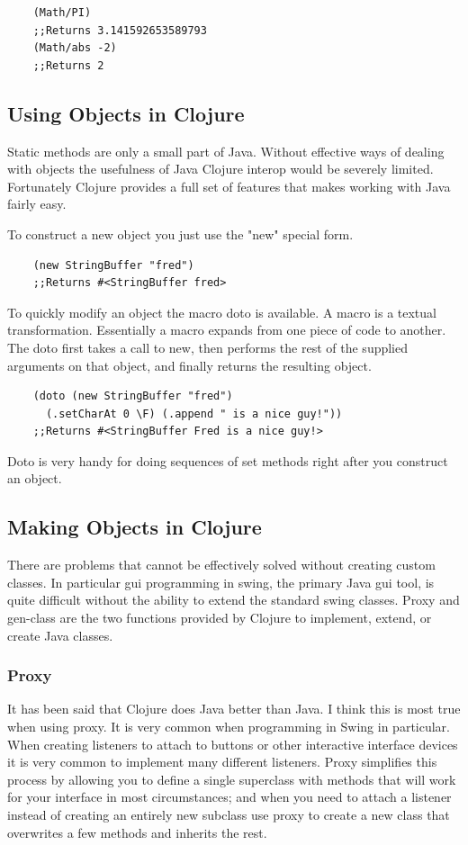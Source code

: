 \documentclass[12pt]{article}
\begin{document}
	\begin{verbatim}
	(Math/PI)
	;;Returns 3.141592653589793
	(Math/abs -2)
	;;Returns 2
	\end{verbatim}
	
	\subsection{Using Objects in Clojure}
	Static methods are only a small part of Java. Without effective ways of dealing with objects the usefulness of Java Clojure interop would be severely limited. Fortunately Clojure provides a full set of features that makes working with Java fairly easy.
	
	To construct a new object you just use the "new" special form.
	\begin{verbatim}
	(new StringBuffer "fred")
	;;Returns #<StringBuffer fred>
	\end{verbatim} 
	
	To quickly modify an object the macro doto is available. A macro is a textual transformation. Essentially a macro expands from one piece of code to another. The doto first takes a call to new, then performs the rest of the supplied arguments on that object, and finally returns the resulting object.
	\begin{verbatim}
	(doto (new StringBuffer "fred") 
	  (.setCharAt 0 \F) (.append " is a nice guy!"))
	;;Returns #<StringBuffer Fred is a nice guy!>
	\end{verbatim}
	Doto is very handy for doing sequences of set methods right after you construct an object.
	
	\subsection{Making Objects in Clojure}
	There are problems that cannot be effectively solved without creating custom classes. In particular gui programming in swing, the primary Java gui tool, is quite difficult without the ability to extend the standard swing classes. Proxy and gen-class are the two functions provided by Clojure to implement, extend, or create Java classes. 
	\subsubsection{Proxy}
	It has been said that Clojure does Java better than Java\cite{halloway:better}. I think this is most true when using proxy. It is very common when programming in Swing in particular. When creating listeners to attach to buttons or other interactive interface devices it is very common to implement many different listeners. Proxy simplifies this process by allowing you to define a single superclass with methods that will work for your interface in most circumstances; and when you need to attach a listener instead of creating an entirely new subclass use proxy to create a new class that overwrites a few methods and inherits the rest. 
	
\end{document}
